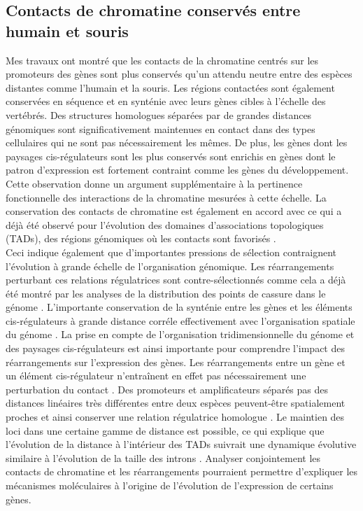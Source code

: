 \subsection{Contacts de chromatine conservés entre humain et souris}
Mes travaux ont montré que les contacts de la chromatine centrés sur les promoteurs des gènes sont plus conservés qu’un attendu neutre entre des espèces distantes comme l’humain et la souris. Les régions contactées sont également conservées en séquence et en synténie avec leurs gènes cibles à l'échelle des vertébrés. Des structures homologues séparées par de grandes distances génomiques sont significativement maintenues en contact dans des types cellulaires qui ne sont pas nécessairement les mêmes. De plus, les gènes dont les paysages \gls{cis}-régulateurs sont les plus conservés sont enrichis en gènes dont le patron d’expression est fortement contraint comme les gènes du développement. Cette observation donne un argument supplémentaire à la pertinence fonctionnelle des interactions de la chromatine mesurées à cette échelle. La conservation des contacts de chromatine est également en accord avec ce qui a déjà été observé pour l’évolution des domaines d’associations topologiques (\acrshort{TAD}s), des régions génomiques où les contacts sont favorisés \citep{dixon_topological_2012, harmston_topologically_2017, krefting_evolutionary_2018}. \\

Ceci indique également que d’importantes pressions de sélection contraignent l’évolution à grande échelle de l’organisation génomique. Les réarrangements perturbant ces relations régulatrices sont contre-sélectionnés comme cela a déjà été montré par les analyses de la distribution des points de cassure dans le génome \citep{lemaitre_analysis_2009, swenson_large-scale_2019}. L’importante conservation de la synténie entre les gènes et les éléments \gls{cis}-régulateurs à grande distance corréle effectivement avec l’organisation spatiale du génome \citep{clement_enhancergene_2020}. La prise en compte de l'organisation tridimensionnelle du génome et des paysages \gls{cis}-régulateurs est ainsi importante pour comprendre l’impact des réarrangements sur l'expression des gènes. Les réarrangements entre un gène et un élément \gls{cis}-régulateur n’entraînent en effet pas nécessairement une perturbation du contact \citep{symmons_SHH_2016}. Des promoteurs et amplificateurs séparés pas des distances linéaires très différentes entre deux espèces peuvent-être spatialement proches et ainsi conserver une relation régulatrice homologue \citep{veron_close_2011}. Le maintien des loci dans une certaine gamme de distance est possible, ce qui explique que l’évolution de la distance à l’intérieur des \acrshort{TAD}s suivrait une dynamique évolutive similaire à l’évolution de la taille des introns \citep{clement_enhancergene_2020}. Analyser conjointement les contacts de chromatine et les réarrangements pourraient permettre d’expliquer les mécanismes moléculaires à l’origine de l’évolution de l’expression de certains gènes. 

